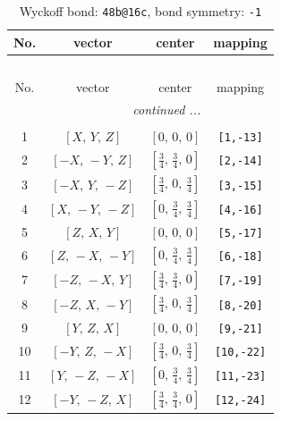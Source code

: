 \documentclass[fleqn,8pt]{jsarticle}
\begin{document}
\renewcommand{\arraystretch}{1.2}
\begin{longtable}{cccc}
\caption{Wyckoff bond: {\tt 48b@16c}, bond symmetry: {\tt -1}}
 \\
 \hline \hline
No. & vector & center & mapping \\ \hline \endfirsthead

\multicolumn{3}{l}{\tablename\ \thetable{}} \\
 \hline \hline
No. & vector & center & mapping \\ \hline \endhead

 \hline \hline
\multicolumn{3}{r}{\footnotesize\it continued ...} \\ \endfoot

 \hline \hline
\multicolumn{3}{r}{} \\ \endlastfoot

1 & $\left[ X,\, Y,\, Z \right]$ & $\left[ 0,\, 0,\, 0 \right]$ & {\tt [1,-13]} \\ \hline
2 & $\left[ - X,\, - Y,\, Z \right]$ & $\left[ \frac{3}{4},\, \frac{3}{4},\, 0 \right]$ & {\tt [2,-14]} \\ \hline
3 & $\left[ - X,\, Y,\, - Z \right]$ & $\left[ \frac{3}{4},\, 0,\, \frac{3}{4} \right]$ & {\tt [3,-15]} \\ \hline
4 & $\left[ X,\, - Y,\, - Z \right]$ & $\left[ 0,\, \frac{3}{4},\, \frac{3}{4} \right]$ & {\tt [4,-16]} \\ \hline
5 & $\left[ Z,\, X,\, Y \right]$ & $\left[ 0,\, 0,\, 0 \right]$ & {\tt [5,-17]} \\ \hline
6 & $\left[ Z,\, - X,\, - Y \right]$ & $\left[ 0,\, \frac{3}{4},\, \frac{3}{4} \right]$ & {\tt [6,-18]} \\ \hline
7 & $\left[ - Z,\, - X,\, Y \right]$ & $\left[ \frac{3}{4},\, \frac{3}{4},\, 0 \right]$ & {\tt [7,-19]} \\ \hline
8 & $\left[ - Z,\, X,\, - Y \right]$ & $\left[ \frac{3}{4},\, 0,\, \frac{3}{4} \right]$ & {\tt [8,-20]} \\ \hline
9 & $\left[ Y,\, Z,\, X \right]$ & $\left[ 0,\, 0,\, 0 \right]$ & {\tt [9,-21]} \\ \hline
10 & $\left[ - Y,\, Z,\, - X \right]$ & $\left[ \frac{3}{4},\, 0,\, \frac{3}{4} \right]$ & {\tt [10,-22]} \\ \hline
11 & $\left[ Y,\, - Z,\, - X \right]$ & $\left[ 0,\, \frac{3}{4},\, \frac{3}{4} \right]$ & {\tt [11,-23]} \\ \hline
12 & $\left[ - Y,\, - Z,\, X \right]$ & $\left[ \frac{3}{4},\, \frac{3}{4},\, 0 \right]$ & {\tt [12,-24]} \\
\end{longtable}
\end{document}
